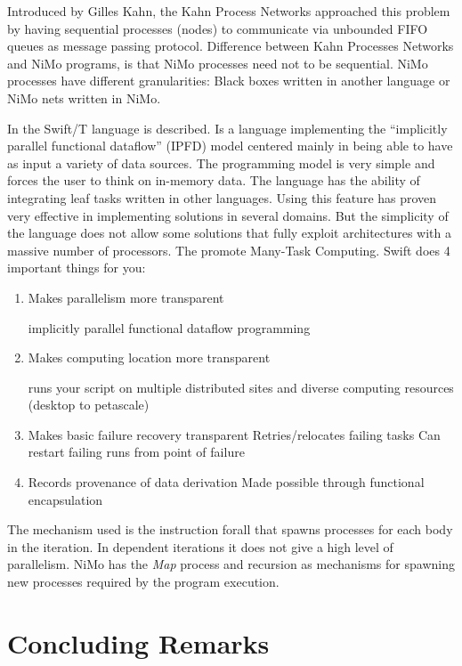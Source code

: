 \documentclass{article}                     \usepackage{graphics}
\begin{document}
Introduced by Gilles Kahn, the Kahn Process Networks approached this
problem by having sequential processes (nodes) to communicate via unbounded
FIFO queues as message passing protocol\cite{Kah74}. Difference between Kahn Processes Networks and NiMo programs, is that NiMo processes need not to be sequential. NiMo processes have different granularities: Black boxes written in another language or NiMo nets written in NiMo. 





In \cite{Wilde:2011:SLD:2286659.2286714} the Swift/T language is described. Is a language implementing the 
“implicitly parallel functional dataflow” (IPFD) model centered mainly in being able to have as input a variety of data sources. The programming model is very simple and forces the user to think on in-memory data. The language has the ability of integrating  leaf tasks written in other languages. Using this feature has proven very effective in implementing solutions in several domains. But the simplicity of the language does not allow some solutions that fully exploit architectures with a massive number of processors. The promote Many-Task Computing.
Swift does 4 important things for you:
\begin{enumerate}
			\item 	Makes	parallelism	more	transparent
		
				implicitly	parallel	functional	dataflow	programming	
\item Makes	computing	location 	more	transparent	

		runs	your	script	on 	multiple	distributed	sites	and	
diverse	computing	resources	(desktop	to	petascale)
\item Makes	basic	 failure	recovery	transparent	
			Retries/relocates	failing	tasks	
			Can	restart	failing	runs	from	point	of	failure	
\item Records	provenance	of	data	derivation	
			Made	possible	through	functional	encapsulation	
			
\end{enumerate}			

		The  mechanism  used is the instruction forall  that spawns processes for each body in the iteration.  In dependent iterations it does not give a high level of parallelism. NiMo has the \textit{Map} process and  recursion as mechanisms for spawning new processes required by the program execution.
\section{Concluding Remarks}\label{CR}
\end{document}
